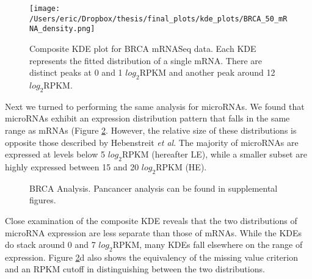 \documentclass[12pt]{report}
\begin{document}
\begin{figure}[H]
\centering
 \texttt{[image: /Users/eric/Dropbox/thesis/final\_plots/kde\_plots/BRCA\_50\_mRNA\_density.png]}
 \caption{Composite KDE plot for BRCA mRNASeq data. Each KDE represents the fitted distribution of a single mRNA. There are distinct peaks at 0 and 1 $log_{2} \text{RPKM}$ and another peak around 12 $log_{2} \text{RPKM}$.}
 \label{fig::brca_mrna_kde}
\end{figure}



Next we turned to performing the same analysis for microRNAs. We found that microRNAs exhibit an expression distribution pattern that falls in the same range as mRNAs (Figure \ref{fig::brca_mirna_kde}. However,
the relative size of these distributions is opposite those described by Hebenstreit \textit{et al}. The majority of microRNAs are expressed at levels below 5 $log_{2} \text{RPKM}$ (hereafter LE), while a smaller subset are highly expressed
between 15 and 20 $log_{2} \text{RPKM}$ (HE).

\begin{figure}[H]
\centering
{}
  \caption{BRCA Analysis. Pancancer analysis can be found in supplemental figures.}
 \label{fig::brca_mirna_kde}
\end{figure}


Close examination of the composite KDE reveals that the two distributions of microRNA expression are less separate than those of mRNAs. While the KDEs do stack around 0 and 7 $log_{2} \text{RPKM}$, many KDEs fall
elsewhere on the range of expression. Figure \ref{fig::brca_mirna_kde}d also shows the equivalency of the missing value criterion and an RPKM cutoff in distinguishing between the two distributions.
\end{document}
